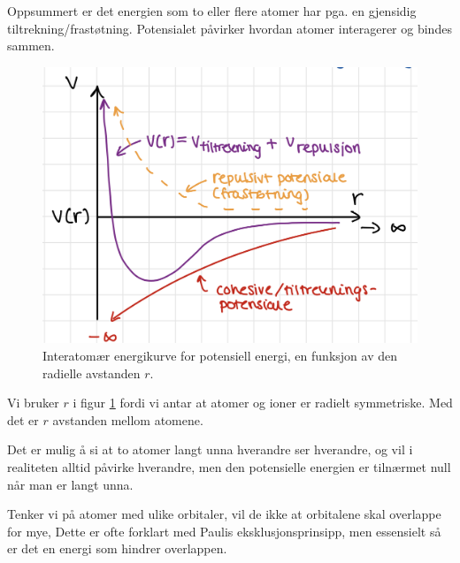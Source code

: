 Oppsummert er det energien som to eller flere atomer har pga. en gjensidig tiltrekning/frastøtning. Potensialet påvirker hvordan atomer interagerer og bindes sammen.

\begin{figure}[!htb]
    \centering
    \includegraphics[scale=0.6]{Bilder/SamtaleTema3/InterPotens/Ipot.png}
    \caption{Interatomær energikurve for potensiell energi, en funksjon av den radielle avstanden $r$.}
    \label{fig:Ipot}
\end{figure}

Vi bruker $r$ i figur \ref{fig:Ipot} fordi vi antar at atomer og ioner er radielt symmetriske. Med det er $r$ avstanden mellom atomene. 

Det er mulig å si at to atomer langt unna hverandre ser hverandre, og vil i realiteten alltid påvirke hverandre, men den potensielle energien er tilnærmet null når man er langt unna. 

Tenker vi på atomer med ulike orbitaler, vil de ikke at orbitalene skal overlappe for mye, Dette er ofte forklart med Paulis eksklusjonsprinsipp, men essensielt så er det en energi som hindrer overlappen.

\newpage
